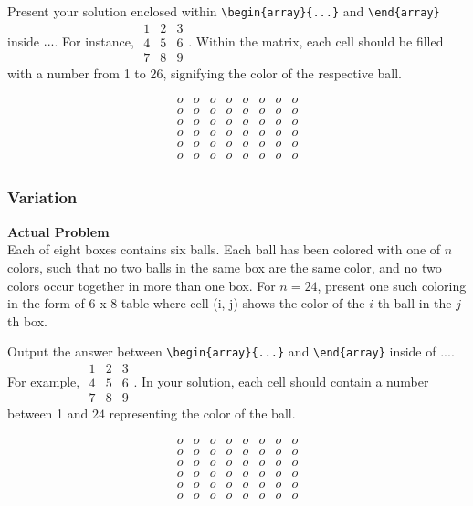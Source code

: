 Present your solution enclosed within \verb|\begin{array}{...}| and \verb|\end{array}| inside \(\boxed{...}\). For instance, \(\boxed{\begin{array}{ccc}1 & 2 & 3 \\ 4 & 5 & 6 \\ 7 & 8 & 9\end{array}}\).
Within the matrix, each cell should be filled with a number from 1 to 26, signifying the color of the respective ball.

$$\begin{array}{cccccccc}
o & o & o & o & o & o & o & o \\
o & o & o & o & o & o & o & o \\
o & o & o & o & o & o & o & o \\
o & o & o & o & o & o & o & o \\
o & o & o & o & o & o & o & o \\
o & o & o & o & o & o & o & o \\
\end{array}$$

\subsubsection{Variation}
\textbf{Actual Problem}\\
Each of eight boxes contains six balls. Each ball has been colored with one of $n$ colors, such that no two balls in the same box are the same color, and no two colors occur together in more than one box.
For $n=24$, present one such coloring in the form of 6 x 8 table where cell (i, j) shows the color of the $i$-th ball in the $j$-th box.

Output the answer between \verb|\begin{array}{...}| and \verb|\end{array}| inside of $\boxed{...}$. For example, $\boxed{\begin{array}{ccc}1 & 2 & 3 \\ 4 & 5 & 6 \\ 7 & 8 & 9\end{array}}$.
In your solution, each cell should contain a number between 1 and $24$ representing the color of the ball.

$$\begin{array}{cccccccc}
o & o & o & o & o & o & o & o \\
o & o & o & o & o & o & o & o \\
o & o & o & o & o & o & o & o \\
o & o & o & o & o & o & o & o \\
o & o & o & o & o & o & o & o \\
o & o & o & o & o & o & o & o \\
\end{array}$$


